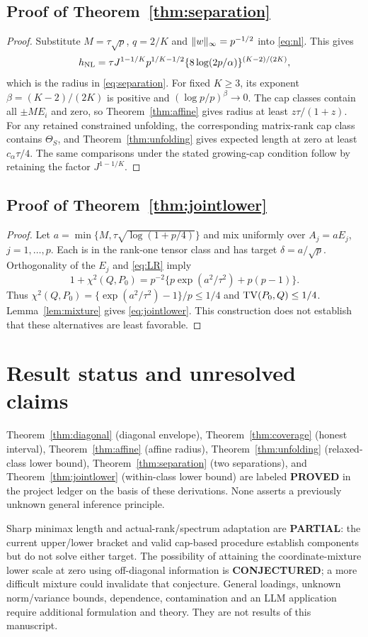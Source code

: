 \subsection{Proof of Theorem~\ref{thm:separation}}

\begin{proof}
Substitute $M=\tau\sqrt p$, $q=2/K$ and $\lVert w\rVert_\infty=p^{-1/2}$ into \eqref{eq:nl}. This gives
\[
 h_{\mathrm{NL}}=\tau J^{1-1/K}
 p^{1/K-1/2}\{8\log(2p/\alpha)\}^{(K-2)/(2K)},
\]
which is the radius in \eqref{eq:separation}. For fixed $K\ge3$, its exponent $\beta=(K-2)/(2K)$ is positive and $(\log p/p)^\beta\to0$. The cap classes contain all $\pm M E_i$ and zero, so Theorem~\ref{thm:affine} gives radius at least $z\tau/(1+z)$. For any retained constrained unfolding, the corresponding matrix-rank cap class contains $\Theta_S$, and Theorem~\ref{thm:unfolding} gives expected length at zero at least $c_\alpha\tau/4$. The same comparisons under the stated growing-cap condition follow by retaining the factor $J^{1-1/K}$.
\end{proof}

\subsection{Proof of Theorem~\ref{thm:jointlower}}

\begin{proof}
Let $a=\min\{M,\tau\sqrt{\log(1+p/4)}\}$ and mix uniformly over $A_j=aE_j$, $j=1,\ldots,p$. Each is in the rank-one tensor class and has target $\delta=a/\sqrt p$. Orthogonality of the $E_j$ and \eqref{eq:LR} imply
\[
 1+\chi^2(Q,P_0)=p^{-2}\{p\exp(a^2/\tau^2)+p(p-1)\}.
\]
Thus $\chi^2(Q,P_0)=\{\exp(a^2/\tau^2)-1\}/p\le1/4$ and $\operatorname{TV}(P_0,Q)\le1/4$. Lemma~\ref{lem:mixture} gives \eqref{eq:jointlower}. This construction does not establish that these alternatives are least favorable.
\end{proof}

\section{Result status and unresolved claims}

Theorem~\ref{thm:diagonal} (diagonal envelope), Theorem~\ref{thm:coverage} (honest interval), Theorem~\ref{thm:affine} (affine radius), Theorem~\ref{thm:unfolding} (relaxed-class lower bound), Theorem~\ref{thm:separation} (two separations), and Theorem~\ref{thm:jointlower} (within-class lower bound) are labeled \textbf{PROVED} in the project ledger on the basis of these derivations. None asserts a previously unknown general inference principle.

Sharp minimax length and actual-rank/spectrum adaptation are \textbf{PARTIAL}: the current upper/lower bracket and valid cap-based procedure establish components but do not solve either target. The possibility of attaining the coordinate-mixture lower scale at zero using off-diagonal information is \textbf{CONJECTURED}; a more difficult mixture could invalidate that conjecture. General loadings, unknown norm/variance bounds, dependence, contamination and an LLM application require additional formulation and theory. They are not results of this manuscript.
